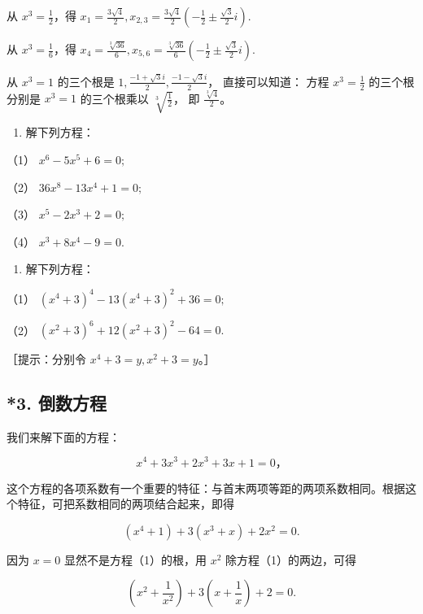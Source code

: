 从 \(x^{3} = \frac{1}{2}\)，得
\(x_{1} = \frac{3\sqrt{4}}{2}, x_{2,3} = \frac{3\sqrt{4}}{2}\left(-\frac{1}{2}\pm \frac{\sqrt{3}}{2} i\right).\)

从 \(x^{3} = \frac{1}{6}\)，得
\(x_{4} = \frac{\sqrt[3]{36}}{6}, x_{5,6} = \frac{\sqrt[3]{36}}{6}\left(-\frac{1}{2}\pm \frac{\sqrt{3}}{2} i\right).\)

 从 \(x^3 = 1\) 的三个根是
\(1, \frac{-1 + \sqrt{3}i}{2}, \frac{-1 - \sqrt{3}i}{2}\)，
直接可以知道： 方程 \(x^3 = \frac{1}{2}\) 的三个根分别是 \(x^3 = 1\)
的三个根乘以 \(\sqrt[3]{\frac{1}{2}}\)， 即 \(\frac{\sqrt[3]{4}}{2}\)。

\begin{enumerate}
\item
  解下列方程：
\end{enumerate}

（1） \(x^{6} - 5x^{5} + 6 = 0;\)

（2） \(36x^{8} - 13x^{4} + 1 = 0;\)

（3） \(x^{5} - 2x^{3} + 2 = 0;\)

（4） \(x^{3} + 8x^{4} - 9 = 0.\)

\begin{enumerate}[start=2]
\item
  解下列方程：
\end{enumerate}

（1） \((x^{4} + 3)^{4} - 13(x^{4} + 3)^{2} + 36 = 0;\)

（2） \((x^{2} + 3)^{6} + 12(x^{2} + 3)^{2} - 64 = 0.\)

［提示：分别令 \(x^4 + 3 = y, x^2 + 3 = y\)。］

\subsection{*3. 倒数方程}

我们来解下面的方程：

\[
x ^ {4} + 3 x ^ {3} + 2 x ^ {3} + 3 x + 1 = 0\text{，} \tag {I}
\]

这个方程的各项系数有一个重要的特征：与首末两项等距的两项系数相同。根据这个特征，可把系数相同的两项结合起来，即得

\[
\left(x ^ {4} + 1\right) + 3 \left(x ^ {3} + x\right) + 2 x ^ {2} = 0. \tag {1}
\]

因为 \(x = 0\) 显然不是方程（1）的根，用 \(x^2\) 除方程（1）的两边，可得

\[
\left(x ^ {2} + \frac {1}{x ^ {2}}\right) + 3 \left(x + \frac {1}{x}\right) + 2 = 0. \tag {2}
\]

